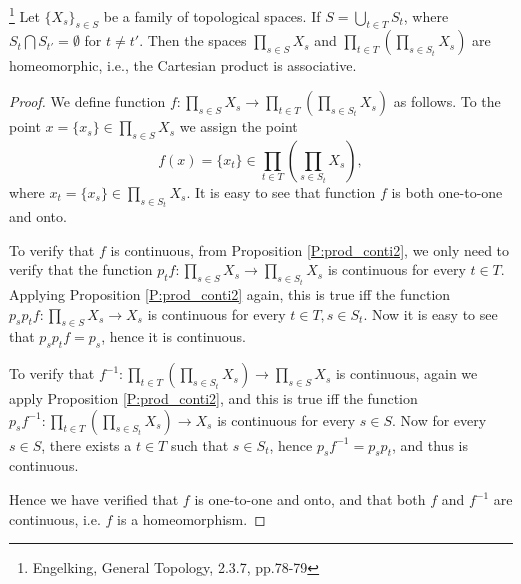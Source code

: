 \begin{proposition} \label{P:prod_assoc}
\footnote{Engelking, General Topology, 2.3.7, pp.78-79}
Let $\{X_s\}_{s\in S}$ be a family of topological spaces. If 
$S=\bigcup_{t\in T} S_t$, where $S_t\bigcap S_{t'}=\emptyset$ for $t\neq t'$. 
Then the spaces $\prod_{s\in S} X_s$ and 
$\prod_{t\in T} (\prod_{s\in S_t} X_s)$ are
homeomorphic, i.e., the Cartesian product is associative.
\end{proposition}
\begin{proof}
We define function $f:\prod_{s\in S} X_s \to \prod_{t\in T} (\prod_{s\in S_t} X_s)$ 
as follows. To the point $x=\{x_s\}\in \prod_{s\in S} X_s$ we assign the point
\[
  f(x) = \{x_t\} \in \prod_{t\in T} (\prod_{s\in S_t} X_s),
\]
where $x_t=\{x_s\} \in \prod_{s\in S_t} X_s$. It is easy to see that function
$f$ is both one-to-one and onto.

To verify that $f$ is continuous, from Proposition \ref{P:prod_conti2}, we only 
need to verify that the function 
$p_t f:\prod_{s\in S} X_s \to \prod_{s\in S_t} X_s$ is continuous for every
$t\in T$. Applying Proposition \ref{P:prod_conti2} again, this is true iff the function
$p_s p_t f:\prod_{s\in S} X_s \to X_s$ is continuous for every 
$t\in T, s\in S_t$. Now it is easy to see that $p_s p_t f=p_s$, hence it is 
continuous.

To verify that 
$f^{-1}:\prod_{t\in T} (\prod_{s\in S_t} X_s) \to \prod_{s\in S} X_s$
is continuous, again we apply Proposition \ref{P:prod_conti2}, and this is true
iff the function
$p_s f^{-1}:\prod_{t\in T} (\prod_{s\in S_t} X_s) \to X_s$ is continuous for
every $s\in S$. Now for every $s\in S$, there exists a $t\in T$ such that 
$s\in S_t$, hence $p_s f^{-1}=p_s p_t$, and thus is continuous.

Hence we have verified that $f$ is one-to-one and onto, and that both $f$ and
$f^{-1}$ are continuous, i.e. $f$ is a homeomorphism.
\end{proof}

